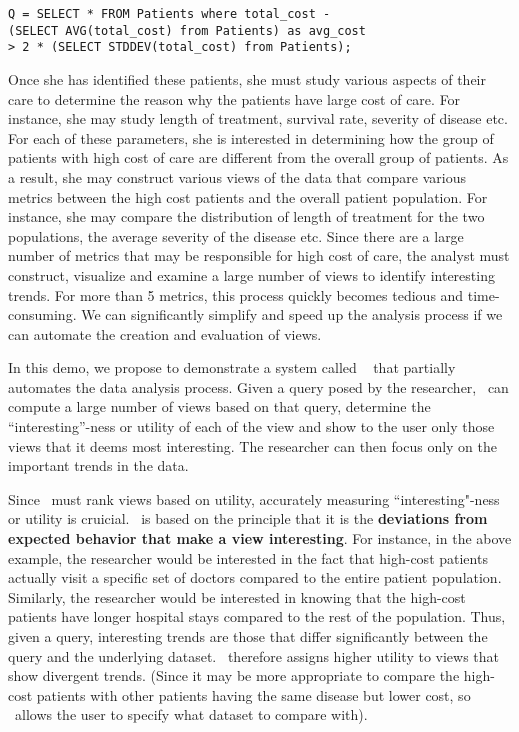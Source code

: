 \noindent 
\begin{small}
\begin{verbatim}
Q = SELECT * FROM Patients where total_cost - 
(SELECT AVG(total_cost) from Patients) as avg_cost
> 2 * (SELECT STDDEV(total_cost) from Patients);
\end{verbatim}
\end{small}

Once she has identified these patients, she must study various aspects of their
care to determine the reason why the patients have large cost of care. For
instance, she may study length of treatment, survival rate, severity of disease
etc. For each of these parameters, she is interested in determining how the
group of patients with high cost of care are different from the overall group of
patients. As a result, she may construct various views of the data that
compare various metrics between the high cost patients and the overall patient
population. For instance, she may compare the distribution of length of
treatment for the two populations, the average severity of the disease
etc. Since there are a large number of metrics that may be responsible for high
cost of care, the analyst must construct, visualize and examine a large number
of views to identify interesting trends. For more than 5 metrics, this process
quickly becomes tedious and time-consuming. We can significantly simplify and
speed up the analysis process if we can automate the creation and evaluation of
views.

In this demo, we propose to demonstrate a system called \SeeDB\
\cite{DBLP:conf/vldb/Parameswaran2013} that partially automates the data
analysis process. Given a query posed by the researcher, \SeeDB\ can compute a
large number of views based on that query, determine the ``interesting''-ness or
utility of each of the view and show to the user only those views that it deems
most interesting. The researcher can then focus only on the important trends in
the data.

Since \SeeDB\ must rank views based on utility, accurately measuring
``interesting"-ness or utility is cruicial. \SeeDB\ is based on the principle
that it is the {\bf deviations from expected behavior that make a view
interesting}. For instance, in the above example, the researcher would be
interested in the fact that high-cost patients actually visit a specific set of
doctors compared to the entire patient population. Similarly, the researcher
would be interested in knowing that the high-cost patients have longer hospital
stays compared to the rest of the population. Thus, given a query, interesting
trends are those that differ significantly between the query and the underlying
dataset. \SeeDB\ therefore assigns higher utility to views that show divergent
trends. (Since it may be more appropriate to compare the high-cost patients with
other patients having the same disease but lower cost, so \SeeDB\ allows the
user to specify what dataset to compare with).

